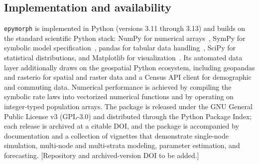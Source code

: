\subsection{Implementation and availability}

\texttt{epymorph} is implemented in Python (versions 3.11 through 3.13) and builds on the
standard scientific Python stack: NumPy for numerical arrays~\citep{harris_array_2020}, SymPy for symbolic
model specification~\citep{meurer_sympy_2017}, pandas for tabular data handling~\citep{mckinney_data_2010}, SciPy for
statistical distributions, and Matplotlib for visualization~\citep{hunter_matplotlib_2007}. Its automated data
layer additionally draws on the geospatial Python ecosystem, including geopandas and
rasterio for spatial and raster data and a Census API client for demographic and commuting
data. Numerical performance is achieved by compiling the symbolic rate laws into vectorized
numerical functions and by operating on integer-typed population arrays. The package is
released under the GNU General Public License v3 (GPL-3.0) and distributed through the
Python Package Index; each release is archived at a citable DOI, and the package is
accompanied by documentation and a collection of vignettes that demonstrate single-node
simulation, multi-node and multi-strata modeling, parameter estimation, and forecasting.
[Repository and archived-version DOI to be added.]
